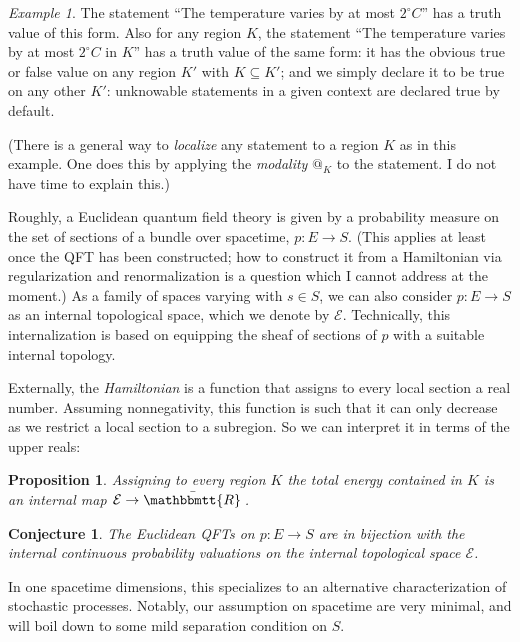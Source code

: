 \documentclass[11pt, oneside, article]{memoir}
\makeatletter
\theoremstyle{plain}
\newtheorem{proposition}[theorem]{Proposition}
\newtheorem{conjecture}[theorem]{Conjecture}
\theoremstyle{definition}
\theoremstyle{remark}
\newtheorem{example}[theorem]{Example}
\newcommand{\internal}[1]{\raisebox{-.03ex}{$\mathbbmtt{#1}$}}
\newcommand{\hs}{\hspace{1.1pt}}
\newcommand{\tRR}{\internal{R}\hs}
\newcommand{\tUR}{\bar{\tRR}\hs}
\newcommand{\AtSymbol}{{@}}
\newcommand{\At}[2][]{\AtSymbol^{#1}_{#2}}
\makeatother
\begin{document}
\begin{example}
The statement ``The temperature varies by at most $2^\circ C$'' has a truth value of this form. Also for any region $K$, the statement ``The temperature varies by at most $2^\circ C$ in $K$'' has a truth value of the same form: it has the obvious true or false value on any region $K'$ with $K\subseteq K'$; and we simply declare it to be true on any other $K'$: unknowable statements in a given context are declared true by default.

(There is a general way to \emph{localize} any statement to a region $K$ as in this example. One does this by applying the \emph{modality} $\At{K}$ to the statement. I do not have time to explain this.)
\end{example}

Roughly, a Euclidean quantum field theory is given by a probability measure on the set of sections of a bundle over spacetime, $p : E \to S$. (This applies at least once the QFT has been constructed; how to construct it from a Hamiltonian via regularization and renormalization is a question which I cannot address at the moment.) As a family of spaces varying with $s\in S$, we can also consider $p : E \to S$ as an internal topological space, which we denote by $\mathcal{E}$. Technically, this internalization is based on equipping the sheaf of sections of $p$ with a suitable internal topology.

Externally, the \emph{Hamiltonian} is a function that assigns to every local section a real number. Assuming nonnegativity, this function is such that it can only decrease as we restrict a local section to a subregion. So we can interpret it in terms of the upper reals:

\begin{proposition}
Assigning to every region $K$ the \emph{total energy} contained in $K$ is an internal map $\mathcal{E} \to \tUR$.
\end{proposition}

\begin{conjecture}
The Euclidean QFTs on $p : E \to S$ are in bijection with the internal continuous probability valuations on the internal topological space $\mathcal{E}$.
\end{conjecture}

In one spacetime dimensions, this specializes to an alternative characterization of stochastic processes. Notably, our assumption on spacetime are very minimal, and will boil down to some mild separation condition on $S$.
\end{document}

